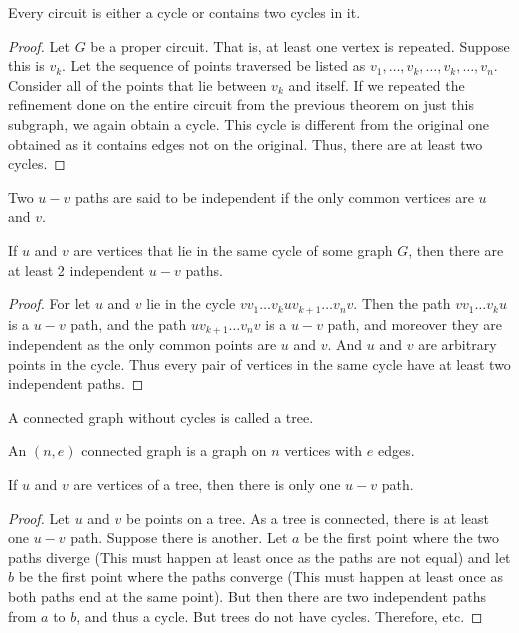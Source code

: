         \begin{theorem}
        Every circuit is either a cycle or contains two cycles in it.
        \end{theorem}
        \begin{proof}
        Let $G$ be a proper circuit. That is, at least one vertex is repeated. Suppose this is $v_k$. Let the sequence of points traversed be listed as $v_1,\hdots, v_k, \hdots,v_k, \hdots, v_n$. Consider all of the points that lie between $v_k$ and itself. If we repeated the refinement done on the entire circuit from the previous theorem on just this subgraph, we again obtain a cycle. This cycle is different from the original one obtained as it contains edges not on the original. Thus, there are at least two cycles.
        \end{proof}
        \begin{definition}
        Two $u-v$ paths are said to be independent if the only common vertices are $u$ and $v$.
        \end{definition}
        \begin{theorem}
        If $u$ and $v$ are vertices that lie in the same cycle of some graph $G$, then there are at least 2 independent $u-v$ paths.
        \end{theorem}
        \begin{proof}
        For let $u$ and $v$ lie in the cycle $vv_1 \hdots v_k u v_{k+1}\hdots v_n v$. Then the path $v v_1 \hdots v_k u$ is a $u-v$ path, and the path $u v_{k+1} \hdots v_n v$ is a $u-v$ path, and moreover they are independent as the only common points are $u$ and $v$. And $u$ and $v$ are arbitrary points in the cycle. Thus every pair of vertices in the same cycle have at least two independent paths.
        \end{proof}
        \begin{definition}
        A connected graph without cycles is called a tree.
        \end{definition}
        \begin{definition}
        An $(n,e)$ connected graph is a graph on $n$ vertices with $e$ edges.
        \end{definition}
        \begin{theorem}
        If $u$ and $v$ are vertices of a tree, then there is only one $u-v$ path.
        \end{theorem}
        \begin{proof}
        Let $u$ and $v$ be points on a tree. As a tree is connected, there is at least one $u-v$ path. Suppose there is another. Let $a$ be the first point where the two paths diverge (This must happen at least once as the paths are not equal) and let $b$ be the first point where the paths converge (This must happen at least once as both paths end at the same point). But then there are two independent paths from $a$ to $b$, and thus a cycle. But trees do not have cycles. Therefore, etc.
        \end{proof}
